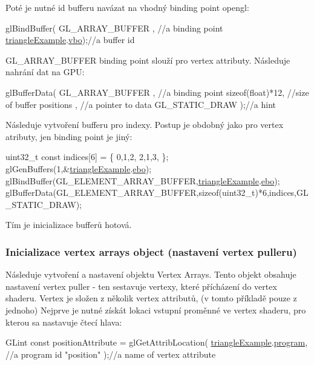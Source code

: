 Poté je nutné id bufferu navázat na vhodný binding point opengl\-: 
\begin{DoxyCodeInclude}
  glBindBuffer(
      GL\_ARRAY\_BUFFER    , \textcolor{comment}{//a binding point}
      \hyperlink{triangleExample_8c_af82b723635ac0c90962571915a1b1163}{triangleExample}.\hyperlink{structTriangleExampleVariables_af3b747228ed4a26fffca56a69838ecae}{vbo});\textcolor{comment}{//a buffer id}
\end{DoxyCodeInclude}
G\-L\-\_\-\-A\-R\-R\-A\-Y\-\_\-\-B\-U\-F\-F\-E\-R binding point slouží pro vertex attributy. Následuje nahrání dat na G\-P\-U\-: 
\begin{DoxyCodeInclude}
  glBufferData(
      GL\_ARRAY\_BUFFER , \textcolor{comment}{//a binding point}
      \textcolor{keyword}{sizeof}(\textcolor{keywordtype}{float})*12, \textcolor{comment}{//size of buffer}
      positions       , \textcolor{comment}{//a pointer to data}
      GL\_STATIC\_DRAW  );\textcolor{comment}{//a hint}
\end{DoxyCodeInclude}
Následuje vytvoření bufferu pro indexy. Postup je obdobný jako pro vertex atributy, jen binding point je jiný\-: 
\begin{DoxyCodeInclude}
  uint32\_t \textcolor{keyword}{const} indices[6] = \{
    0,1,2,
    2,1,3,
  \};
  glGenBuffers(1,&\hyperlink{triangleExample_8c_af82b723635ac0c90962571915a1b1163}{triangleExample}.\hyperlink{structTriangleExampleVariables_a9e7c6acc784faacf21bca7c46f9f4244}{ebo});
  glBindBuffer(GL\_ELEMENT\_ARRAY\_BUFFER,\hyperlink{triangleExample_8c_af82b723635ac0c90962571915a1b1163}{triangleExample}.\hyperlink{structTriangleExampleVariables_a9e7c6acc784faacf21bca7c46f9f4244}{ebo});
  glBufferData(GL\_ELEMENT\_ARRAY\_BUFFER,\textcolor{keyword}{sizeof}(uint32\_t)*6,indices,GL\_STATIC\_DRAW);
\end{DoxyCodeInclude}
Tím je inicializace bufferů hotová. \hypertarget{triangleExample.c_VAO}{}\subsubsection{Inicializace vertex arrays object (nastavení vertex pulleru)}\label{triangleExample.c_VAO}
Následuje vytvoření a nastavení objektu Vertex Arrays. Tento objekt obsahuje nastavení vertex puller -\/ ten sestavuje vertexy, které přícházení do vertex shaderu. Vertex je složen z několik vertex attributů, (v tomto příkladě pouze z jednoho) Nejprve je nutné získát lokaci vstupní proměnné ve vertex shaderu, pro kterou sa nastavuje čtecí hlava\-: 
\begin{DoxyCodeInclude}
  GLint \textcolor{keyword}{const} positionAttribute = glGetAttribLocation(
      \hyperlink{triangleExample_8c_af82b723635ac0c90962571915a1b1163}{triangleExample}.\hyperlink{structTriangleExampleVariables_abc287e489a25d4e3c4ad1899d183881d}{program}, \textcolor{comment}{//a program id}
      \textcolor{stringliteral}{"position"}             );\textcolor{comment}{//a name of vertex attribute}
\end{DoxyCodeInclude}
